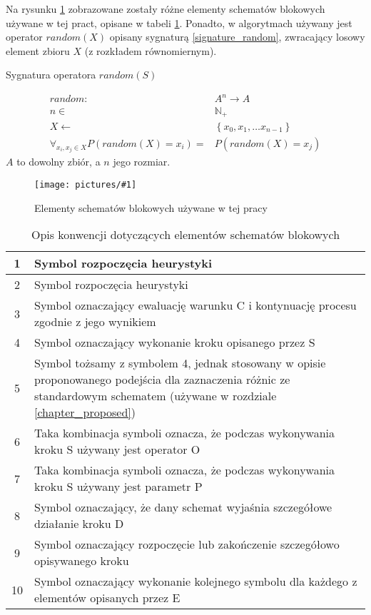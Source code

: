 \documentclass[twoside]{iisthesis}
\newcommand{\numberSet}{\mathbb}
\newcommand{\circled}[1]{\textcircled{\small{#1}}}
\newcommand{\img}[1]{\texttt{[image: pictures/\#1]}}
\begin{document}
Na rysunku \ref{figure_flowchart_conventions} zobrazowane zostały różne elementy schematów blokowych używane w tej pract, opisane w tabeli \ref{table_flowchart_conventions}. Ponadto, w algorytmach używany jest operator $random(X)$ opisany sygnaturą \ref{signature_random}, zwracający losowy element zbioru $X$ (z rozkładem równomiernym).

\begin{signature}
	\caption{Sygnatura operatora $random(S)$ \label{signature_random}}
	\begin{align}
	random: &A^n \rightarrow A \\
	n \in &\numberSet{N}_{+} \\
	X \gets &\left\{ x_0, x_1, \dots x_{n-1} \right\} \\
	\forall_{x_i, x_j \in X} P(random(X) = x_i) = &P(random(X) = x_j)
	\end{align}
	$A$ to dowolny zbiór, a $n$ jego rozmiar.
\end{signature}

\begin{figure}[H]
	\caption{Elementy schematów blokowych używane w tej pracy \label{figure_flowchart_conventions}}
	\img{conventions.png}
\end{figure}

\begin{table}[H]
	\caption{Opis konwencji dotyczących elementów schematów blokowych \label{table_flowchart_conventions}}
	\begin{tabularx}{\linewidth}{|c|X|}
		\hline 
		\circled{1} & Symbol rozpoczęcia heurystyki \\
		\hline
		\circled{2} & Symbol rozpoczęcia heurystyki \\
		\hline
		\circled{3} & Symbol oznaczający ewaluację warunku C i kontynuację procesu zgodnie z jego wynikiem \\
		\hline
		\circled{4} & Symbol oznaczający wykonanie kroku opisanego przez S \\
		\hline
		\circled{5} & Symbol tożsamy z symbolem \circled{4}, jednak stosowany w opisie proponowanego podejścia dla zaznaczenia różnic ze standardowym schematem (używane w rozdziale \ref{chapter_proposed})\\
		\hline
		\circled{6} & Taka kombinacja symboli oznacza, że podczas wykonywania kroku S używany jest operator O \\
		\hline
		\circled{7} & Taka kombinacja symboli oznacza, że podczas wykonywania kroku S używany jest parametr P \\
		\hline
		\circled{8} & Symbol oznaczający, że dany schemat wyjaśnia szczegółowe działanie kroku D \\
		\hline
		\circled{9} & Symbol oznaczający rozpoczęcie lub zakończenie szczegółowo opisywanego kroku \\
		\hline
		\circled{10} & Symbol oznaczający wykonanie kolejnego symbolu dla każdego z elementów opisanych przez E \\
		\hline
	\end{tabularx}
\end{table}
\end{document}
